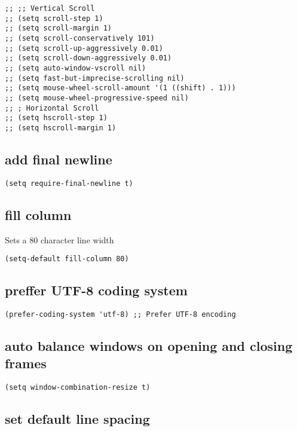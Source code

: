 \documentclass[11pt]{article}
\begin{document}
\begin{verbatim}
;; ;; Vertical Scroll
;; (setq scroll-step 1)
;; (setq scroll-margin 1)
;; (setq scroll-conservatively 101)
;; (setq scroll-up-aggressively 0.01)
;; (setq scroll-down-aggressively 0.01)
;; (setq auto-window-vscroll nil)
;; (setq fast-but-imprecise-scrolling nil)
;; (setq mouse-wheel-scroll-amount '(1 ((shift) . 1)))
;; (setq mouse-wheel-progressive-speed nil)
;; ; Horizontal Scroll
;; (setq hscroll-step 1)
;; (setq hscroll-margin 1)
\end{verbatim}

\subsection*{add final newline}
\label{sec:org08f5844}

\begin{verbatim}
(setq require-final-newline t)
\end{verbatim}

\subsection*{fill column}
\label{sec:org381ddd8}

Sets a 80 character line width

\begin{verbatim}
(setq-default fill-column 80)
\end{verbatim}

\subsection*{preffer UTF-8 coding system}
\label{sec:org71335e3}
\begin{verbatim}
(prefer-coding-system 'utf-8) ;; Prefer UTF-8 encoding
\end{verbatim}

\subsection*{auto balance windows on opening and closing frames}
\label{sec:org3ebd34c}

\begin{verbatim}
(setq window-combination-resize t)
\end{verbatim}

\subsection*{set default line spacing}
\label{sec:org0709127}
\end{document}
